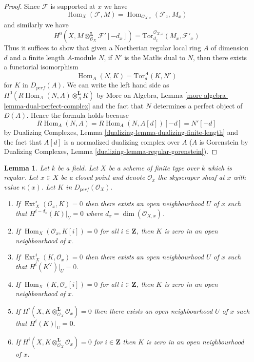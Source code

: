 \documentclass{stacks-project}
\theoremstyle{plain}
\newtheorem{lemma}[subsection]{Lemma}
\theoremstyle{definition}
\theoremstyle{remark}
\numberwithin{equation}{subsection}
\def\Hom{\mathop{\mathrm{Hom}}\nolimits}
\def\Ext{\mathop{\mathrm{Ext}}\nolimits}
\begin{document}
\begin{proof}
Since $\mathcal{F}$ is supported at $x$ we have
$$
\Hom_X(\mathcal{F}, M) =
\Hom_{\mathcal{O}_{X, x}}(\mathcal{F}_x, M_x)
$$
and similarly we have
$$
H^0(X, M \otimes_{\mathcal{O}_X}^\mathbf{L} \mathcal{F}'[-d_x]) =
\text{Tor}^{\mathcal{O}_{X, x}}_{d_x}(M_x, \mathcal{F}'_x)
$$
Thus it suffices to show that given a Noetherian regular local ring $A$
of dimension $d$ and a finite length $A$-module $N$, if
$N'$ is the Matlis dual to $N$, then there exists a functorial isomorphism
$$
\Hom_A(N, K) = \text{Tor}^A_d(K, N')
$$
for $K$ in $D_{perf}(A)$. We can write the left hand side as
$H^0(R\Hom_A(N, A) \otimes_A^\mathbf{L} K)$ by
More on Algebra, Lemma \ref{more-algebra-lemma-dual-perfect-complex}
and the fact that $N$ determines a perfect object of $D(A)$.
Hence the formula holds because
$$
R\Hom_A(N, A) = R\Hom_A(N, A[d])[-d] = N'[-d]
$$
by Dualizing Complexes, Lemma \ref{dualizing-lemma-dualizing-finite-length}
and the fact that $A[d]$ is a normalized dualizing complex over $A$
($A$ is Gorenstein by
Dualizing Complexes, Lemma \ref{dualizing-lemma-regular-gorenstein}).
\end{proof}

\begin{lemma}
\label{lemma-orthogonal-point-sheaf}
Let $k$ be a field. Let $X$ be a scheme of finite type over $k$ which
is regular. Let $x \in X$ be a closed point and denote $\mathcal{O}_x$
the skyscraper sheaf at $x$ with value $\kappa(x)$. Let $K$ in
$D_{perf}(\mathcal{O}_X)$.
\begin{enumerate}
\item If $\Ext^i_X(\mathcal{O}_x, K) = 0$ then there exists an open
neighbourhood $U$ of $x$ such that $H^{i - d_x}(K)|_U = 0$ where
$d_x = \dim(\mathcal{O}_{X, x})$.
\item If $\Hom_X(\mathcal{O}_x, K[i]) = 0$ for all
$i \in \mathbf{Z}$, then $K$ is zero in an open neighbourhood of $x$.
\item If $\Ext^i_X(K, \mathcal{O}_x) = 0$ then there exists an open
neighbourhood $U$ of $x$ such that $H^i(K^\vee)|_U = 0$.
\item If $\Hom_X(K, \mathcal{O}_x[i]) = 0$ for all
$i \in \mathbf{Z}$, then $K$ is zero in an open neighbourhood of $x$.
\item If $H^i(X, K \otimes_{\mathcal{O}_X}^\mathbf{L} \mathcal{O}_x) = 0$
then there exists an open neighbourhood $U$ of $x$ such that
$H^i(K)|_U = 0$.
\item If $H^i(X, K \otimes_{\mathcal{O}_X}^\mathbf{L} \mathcal{O}_x) = 0$
for $i \in \mathbf{Z}$ then $K$ is zero in an
open neighbourhood of $x$.
\end{enumerate}
\end{lemma}
\end{document}
